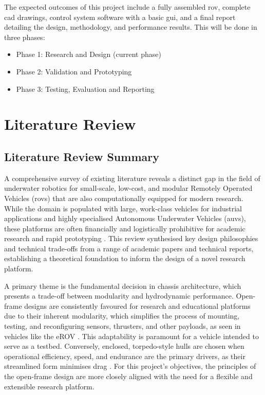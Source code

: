 \documentclass[11pt, a4paper]{article}
\begin{document}
The expected outcomes of this project include a fully assembled \gls{rov}, complete \gls{cad} drawings, control system software with a basic \gls{gui}, and a final report detailing the design, methodology, and performance results. This will be done in three phases:
\begin{itemize}
    \item Phase 1: Research and Design (current phase)
    \item Phase 2: Validation and Prototyping 
    \item Phase 3: Testing, Evaluation and Reporting
\end{itemize}


\section{Literature Review}
\subsection{Literature Review Summary}
\label{sec:litreview_summary}
A comprehensive survey of existing literature reveals a distinct gap in the field of underwater robotics for small-scale, low-cost, and modular Remotely Operated Vehicles (\gls{rov}s) that are also computationally equipped for modern research. While the domain is populated with large, work-class vehicles for industrial applications and highly specialised Autonomous Underwater Vehicles (\gls{auv}s), these platforms are often financially and logistically prohibitive for academic research and rapid prototyping \cite{9659412}. This review synthesised key design philosophies and technical trade-offs from a range of academic papers and technical reports, establishing a theoretical foundation to inform the design of a novel research platform.

A primary theme is the fundamental decision in chassis architecture, which presents a trade-off between modularity and hydrodynamic performance. Open-frame designs are consistently favoured for research and educational platforms due to their inherent modularity, which simplifies the process of mounting, testing, and reconfiguring sensors, thrusters, and other payloads, as seen in vehicles like the eROV \cite{8615595}. This adaptability is paramount for a vehicle intended to serve as a testbed. Conversely, enclosed, torpedo-style hulls are chosen when operational efficiency, speed, and endurance are the primary drivers, as their streamlined form minimises drag \cite{5723752, 7893910}. For this project's objectives, the principles of the open-frame design are more closely aligned with the need for a flexible and extensible research platform.
\end{document}
